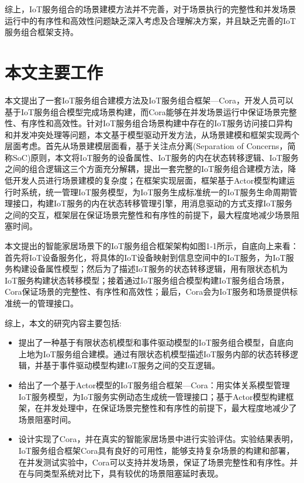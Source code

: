 \documentclass[winfonts,master,twoside]{njuthesis}
\begin{document}
综上，IoT服务组合的场景建模方法并不完善，对于场景执行的完整性和并发场景运行中的有序性和高效性问题缺乏深入考虑及合理解决方案，并且缺乏完善的IoT服务组合框架支持。


\section{本文主要工作}
本文提出了一套IoT服务组合建模方法及IoT服务组合框架—Cora，开发人员可以基于IoT服务组合模型完成场景构建，而Cora能够在并发场景运行中保证场景完整性、有序性和高效性。针对IoT服务组合场景构建中存在的IoT服务访问接口异构和并发冲突处理等问题，本文基于模型驱动开发方法，从场景建模和框架实现两个层面考虑。首先从场景建模层面看，基于关注点分离(Separation of Concerns，简称SoC)原则，本文将IoT服务的设备属性、IoT服务的内在状态转移逻辑、IoT服务之间的组合逻辑这三个方面充分解耦，提出一套完整的IoT服务组合建模方法，降低开发人员进行场景建模的复杂度；在框架实现层面，框架基于Actor模型构建运行时系统，统一管理IoT服务模型，为IoT服务生成标准统一的IoT服务生命周期管理接口，构建IoT服务的内在状态转移管理引擎，用消息驱动的方式支撑IoT服务之间的交互，框架层在保证场景完整性和有序性的前提下，最大程度地减少场景阻塞时间。

本文提出的智能家居场景下的IoT服务组合框架架构如图1-1所示，自底向上来看：首先将IoT设备服务化，将具体的IoT设备映射到信息空间中的IoT服务，为IoT服务构建设备属性模型；然后为了描述IoT服务的状态转移逻辑，用有限状态机为IoT服务构建状态转移模型；接着通过IoT服务组合模型构建IoT服务组合场景，Cora保证场景的完整性、有序性和高效性；最后，Cora会为IoT服务和场景提供标准统一的管理接口。

综上，本文的研究内容主要包括:
\begin{itemize}
    \item 提出了一种基于有限状态机模型和事件驱动模型的IoT服务组合模型，自底向上地为IoT服务组合建模。通过有限状态机模型描述IoT服务内部的状态转移逻辑，并基于事件驱动模型构建IoT服务之间的交互逻辑。
    \item 给出了一个基于Actor模型的IoT服务组合框架—Cora：用实体关系模型管理IoT服务模型，为IoT服务实例动态生成统一管理接口；基于Actor模型构建框架，在并发处理中，在保证场景完整性和有序性的前提下，最大程度地减少了场景阻塞时间。
    \item 设计实现了Cora，并在真实的智能家居场景中进行实验评估。实验结果表明，IoT服务组合框架Cora具有良好的可用性，能够支持复杂场景的构建和部署，在并发测试实验中，Cora可以支持并发场景，保证了场景完整性和有序性。并在与同类型系统对比下，具有较优的场景阻塞延时表现。
\end{itemize}
\end{document}
